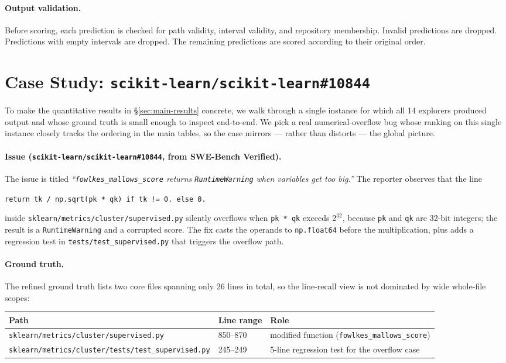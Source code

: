 \documentclass{llmxive}
\begin{document}
\paragraph{Output validation.}
Before scoring, each prediction is checked for path validity, interval validity,
and repository membership. Invalid predictions are dropped. Predictions with
empty intervals are dropped. The remaining predictions are scored according to
their original order.


\section{Case Study: \texttt{scikit-learn/scikit-learn\#10844}}
\label{appendix:case-study}

To make the quantitative results in \S\ref{sec:main-results} concrete, we walk through a single instance for which all 14 explorers produced output and whose ground truth is small enough to inspect end-to-end. We pick a real numerical-overflow bug whose ranking on this single instance closely tracks the ordering in the main tables, so the case mirrors --- rather than distorts --- the global picture.

\paragraph{Issue (\texttt{scikit-learn/scikit-learn\#10844}, from SWE-Bench Verified).}
The issue is titled \emph{``\texttt{fowlkes\_mallows\_score} returns \texttt{RuntimeWarning} when variables get too big.''} The reporter observes that the line
\begin{center}\small\texttt{return tk / np.sqrt(pk * qk) if tk != 0. else 0.}\end{center}
inside \texttt{sklearn/metrics/cluster/supervised.py} silently overflows when \texttt{pk * qk} exceeds $2^{32}$, because \texttt{pk} and \texttt{qk} are 32-bit integers; the result is a \texttt{RuntimeWarning} and a corrupted score. The fix casts the operands to \texttt{np.float64} before the multiplication, plus adds a regression test in \texttt{tests/test\_supervised.py} that triggers the overflow path.

\paragraph{Ground truth.}
The refined ground truth lists two core files spanning only $26$ lines in total, so the line-recall view is not dominated by wide whole-file scopes:
\begin{center}\small
\begin{tabular}{lll}
\toprule
Path & Line range & Role \\
\midrule
\texttt{sklearn/metrics/cluster/supervised.py}              & 850--870  & modified function (\texttt{fowlkes\_mallows\_score}) \\
\texttt{sklearn/metrics/cluster/tests/test\_supervised.py}  & 245--249  & 5-line regression test for the overflow case \\
\bottomrule
\end{tabular}
\end{center}
\end{document}
